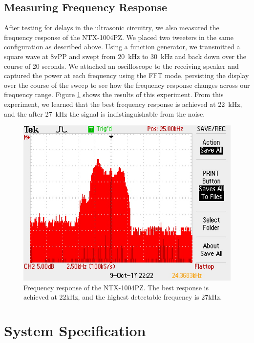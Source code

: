 \documentclass{article}
\begin{document}
  \subsection{Measuring Frequency Response}

      After testing for delays in the ultrasonic circuitry, we also measured the frequency response of the NTX-1004PZ. We placed two tweeters in the same configuration as described above. Using a function generator, we transmitted a square wave at 8vPP and swept from \SI{20}{\kilo\hertz} to \SI{30}{\kilo\hertz} and back down over the course of 20 seconds. We attached an oscilloscope to the receiving speaker and captured the power at each frequency using the FFT mode, persisting the display over the course of the sweep to see how the frequency response changes across our frequency range. Figure \ref{fig:frequency_response} shows the results of this experiment. From this experiment, we learned that the best frequency response is achieved at \SI{22}{\kilo\hertz}, and the after \SI{27}{\kilo\hertz} the signal is indistinguishable from the noise.

      \begin{figure}
        \centering
        \includegraphics[scale=0.75]{./images/frequency_response.JPG}
        \caption{Frequency response of the NTX-1004PZ. The best response is achieved at 22kHz, and the highest detectable frequency is 27kHz.}
        \label{fig:frequency_response}
      \end{figure}

\section{System Specification} \label{specs}
\end{document}
